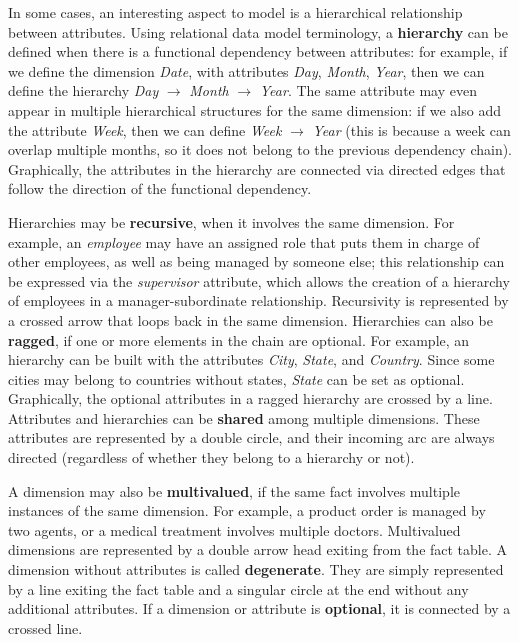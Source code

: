 In some cases, an interesting aspect to model is a hierarchical relationship between attributes. Using relational data model terminology, a \textbf{hierarchy} can be defined when there is a functional dependency between attributes: for example, if we define the dimension \textit{Date}, with attributes \textit{Day}, \textit{Month}, \textit{Year}, then we can define the hierarchy \textit{Day} $\rightarrow$ \textit{Month} $\rightarrow$ \textit{Year}. The same attribute may even appear in multiple hierarchical structures for the same dimension: if we also add the attribute \textit{Week}, then we can define \textit{Week} $\rightarrow$ \textit{Year} (this is because a week can overlap multiple months, so it does not belong to the previous dependency chain). Graphically, the attributes in the hierarchy are connected via directed edges that follow the direction of the functional dependency.

Hierarchies may be \textbf{recursive}, when it involves the same dimension. For example, an \textit{employee} may have an assigned role that puts them in charge of other employees, as well as being managed by someone else; this relationship can be expressed via the \textit{supervisor} attribute, which allows the creation of a hierarchy of employees in a manager-subordinate relationship. Recursivity is represented by a crossed arrow that loops back in the same dimension. Hierarchies can also be \textbf{ragged}, if one or more elements in the chain are optional. For example, an hierarchy can be built with the attributes \textit{City}, \textit{State}, and \textit{Country}. Since some cities may belong to countries without states, \textit{State} can be set as optional. Graphically, the optional attributes in a ragged hierarchy are crossed by a line. Attributes and hierarchies can be \textbf{shared} among multiple dimensions. These attributes are represented by a double circle, and their incoming arc are always directed (regardless of whether they belong to a hierarchy or not).

A dimension may also be \textbf{multivalued}, if the same fact involves multiple instances of the same dimension. For example, a product order is managed by two agents, or a medical treatment involves multiple doctors. Multivalued dimensions are represented by a double arrow head exiting from the fact table. A dimension without attributes is called \textbf{degenerate}. They are simply represented by a line exiting the fact table and a singular circle at the end without any additional attributes. If a dimension or attribute is \textbf{optional}, it is connected by a crossed line.

